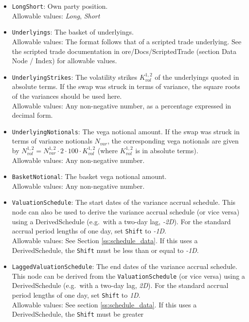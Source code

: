 \begin{itemize}
  \item \lstinline!LongShort!: Own party position. \\
    Allowable values: \emph{Long}, \emph{Short}
  \item \lstinline!Underlyings!: The basket of underlyings. \\
    Allowable values: The format follows that of a scripted trade underlying. See the scripted trade documentation in
    ore/Docs/ScriptedTrade (section Data Node / Index) for allowable values.
  \item \lstinline!UnderlyingStrikes!: The volatility strikes $K^{1,2}_{vol}$ of the underlyings quoted in absolute terms.
  If the swap was struck in terms of variance, the square roots of the variances should be used here. \\
    Allowable values: Any non-negative number, as a percentage expressed in decimal form.
  \item \lstinline!UnderlyingNotionals!: The vega notional amount. If the swap was struck in terms of variance notionals
  $N_{var}$, the corresponding vega notionals are given by $N^{1,2}_{vol} = N^{1,2}_{var} \cdot 2 \cdot 100 \cdot K^{1,2}_{vol}$
  (where $K^{1,2}_{vol}$ is in absolute terms). \\
    Allowable values: Any non-negative number.
  \item{} \lstinline!BasketNotional!: The basket vega notional amount. \\
    Allowable values: Any non-negative number.
  \item{} \lstinline!ValuationSchedule!: The start dates of the variance accrual schedule. This node can
  also be used to derive the variance accrual schedule (or vice versa) using a DerivedSchedule (e.g.\ with a two-day lag, \emph{-2D}).
  For the standard accrual period lengths of one day, set \lstinline!Shift! to \emph{-1D}. \\
    Allowable values: See Section \ref{ss:schedule_data}. If this uses a DerivedSchedule, the \lstinline!Shift! must be less
  than or equal to \emph{-1D}.
  \item{} \lstinline!LaggedValuationSchedule!: The end dates of the variance accrual schedule. This node can be derived from
  the \lstinline!ValuationSchedule! (or vice versa) using a DerivedSchedule (e.g.\ with a two-day lag, \emph{2D}). For the standard
  accrual period lengths of one day, set \lstinline!Shift! to \emph{1D}. \\
    Allowable values: See section \ref{ss:schedule_data}. If this uses a DerivedSchedule, the \lstinline!Shift! must be greater

\end{itemize}
